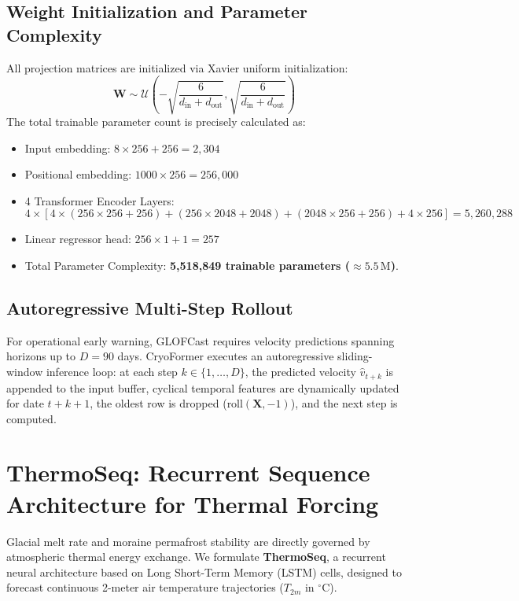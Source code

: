 \documentclass{mnnit}
\begin{document}
\subsection{Weight Initialization and Parameter Complexity}
All projection matrices are initialized via Xavier uniform initialization:
\begin{equation}
    \mathbf{W} \sim \mathcal{U}\left(-\sqrt{\frac{6}{d_{\text{in}} + d_{\text{out}}}}, \sqrt{\frac{6}{d_{\text{in}} + d_{\text{out}}}}\right)
\end{equation}
The total trainable parameter count is precisely calculated as:
\begin{itemize}
    \item Input embedding: $8 \times 256 + 256 = 2,304$
    \item Positional embedding: $1000 \times 256 = 256,000$
    \item 4 Transformer Encoder Layers:
    \begin{equation*}
        4 \times \left[4 \times (256 \times 256 + 256) + (256 \times 2048 + 2048) + (2048 \times 256 + 256) + 4 \times 256\right] = 5,260,288
    \end{equation*}
    \item Linear regressor head: $256 \times 1 + 1 = 257$
    \item Total Parameter Complexity: \textbf{5,518,849 trainable parameters ($\approx 5.5\,\text{M}$)}.
\end{itemize}

\subsection{Autoregressive Multi-Step Rollout}
For operational early warning, GLOFCast requires velocity predictions spanning horizons up to $D = 90$ days. CryoFormer executes an autoregressive sliding-window inference loop: at each step $k \in \{1, \dots, D\}$, the predicted velocity $\hat{v}_{t+k}$ is appended to the input buffer, cyclical temporal features are dynamically updated for date $t+k+1$, the oldest row is dropped ($\text{roll}(\mathbf{X}, -1)$), and the next step is computed.

\section{ThermoSeq: Recurrent Sequence Architecture for Thermal Forcing}
Glacial melt rate and moraine permafrost stability are directly governed by atmospheric thermal energy exchange. We formulate \textbf{ThermoSeq}, a recurrent neural architecture based on Long Short-Term Memory (LSTM) cells, designed to forecast continuous 2-meter air temperature trajectories ($T_{2m}$ in $^\circ\text{C}$).
\end{document}
